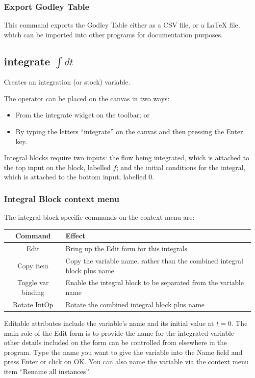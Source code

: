 \subsubsection{Export Godley Table}

This command exports the Godley Table either as a CSV file, or a LaTeX
file, which can be imported into other programs for documentation
purposes.

\subsection{integrate $\int dt$}

\label{IntOp} Creates an integration (or stock) variable.


The operator can be placed on the canvas in two ways:
\begin{itemize}
\item From the integrate widget  on the
toolbar; or 
\item By typing the letters ``integrate'' on the canvas and then pressing
the Enter key.
\end{itemize}
Integral blocks require two inputs: the flow being integrated, which
is attached to the top input on the block, labelled $f$; and the
initial conditions for the integral, which is attached to the bottom
input, labelled $0$.

\subsubsection{Integral Block context menu}

The integral-block-specific commands on the context menu are:

\noindent\begin{tabular}{|c|p{}|}
\hline 
Command & Effect\tabularnewline
\hline 
\hline 
Edit & Bring up the Edit form for this integrals\tabularnewline
\hline 
Copy item & Copy the variable name, rather than the combined integral block plus
name\tabularnewline
\hline 
Toggle var binding & Enable the integral block to be separated from the variable name\tabularnewline
\hline 
Rotate IntOp & Rotate the combined integral block plus name\tabularnewline
\hline 
\end{tabular}

Editable attributes include the variable's name and its initial value
at $t=0$. The main role of the Edit form is to provide the name for
the integrated variable---other details included on the form can
be controlled from elsewhere in the program. Type the name you want
to give the variable into the Name field and press Enter or click
on OK. You can also name the variable via the context menu item ``Rename
all instances''.

